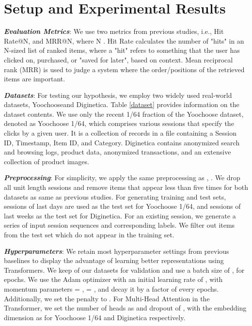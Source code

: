 \documentclass[conference]{IEEEtran}
\begin{document}
\section{Setup and Experimental Results}





\textbf{\textit{Evaluation Metrics}}: We use two metrics from previous studies, i.e., Hit Rate@N, and MRR@N, where N . Hit Rate calculates the number of "hits" in an N-sized list of ranked items, where a "hit" refers to something that the user has clicked on, purchased, or "saved for later", based on context. Mean reciprocal rank (MRR) is used to judge a system where the order/positions of the retrieved items are important.

\textbf{\textit{Datasets}}: For testing our hypothesis, we employ two widely used real-world datasets, Yoochoose\footnotemark[2] and Diginetica\footnotemark[1]. Table \ref{dataset} provides information on the dataset contents. We use only the recent 1/64 fraction of the Yoochoose dataset, denoted as Yoochoose 1/64, which comprises various sessions that specify the clicks by a given user. It is a collection of records in a file containing a Session ID, Timestamp, Item ID, and Category. Diginetica contains anonymized search and browsing logs, product data, anonymized transactions, and an extensive collection of product images.


\textbf{\textit{Preprocessing}}: For simplicity, we apply the same preprocessing as \cite{yu2020tagnn}, \cite{Wu:2019ke}. We drop all unit length sessions and remove items that appear less than five times for both datasets as same as previous studies. For generating training and test sets, sessions of last days are used as the test set for Yoochoose 1/64, and sessions of last weeks as the test set for Diginetica. For an existing session, we generate a series of input session sequences and corresponding labels. We filter out items from the test set which do not appear in the training set.

\textbf{\textit{Hyperparameters}}: We retain most hyperparameter settings from previous baselines to display the advantage of learning better representations using Transformers. We keep  of our datasets for validation and use a batch size of , for  epochs. We use the Adam \cite{da2014method} optimizer with an initial learning rate of , with momentum parameters  = ,  = , and decay it by a factor of  every  epochs. Additionally, we set the  penalty to . 
For Multi-Head Attention in the Transformer, we set the number of heads as  and dropout of , with the embedding dimension as  for Yoochoose 1/64 and Diginetica respectively.
\end{document}
